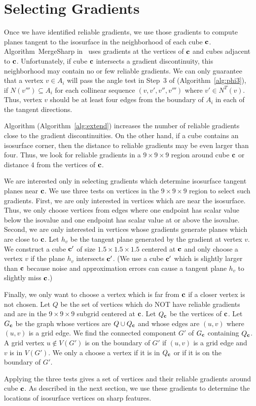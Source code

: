 
\section{Selecting Gradients}
\label{sec:grad_select}

Once we have identified reliable gradients,
we use those gradients to compute planes tangent to the isosurface
in the neighborhood of each cube $\mathbf{c}$.
Algorithm~MergeSharp in~\cite{bw-cisec-13}
uses gradients at the vertices of $\mathbf{c}$ and cubes adjacent to $\mathbf{c}$.
Unfortunately, if cube $\mathbf{c}$ intersects a gradient discontinuity,
this neighborhood may contain no or few reliable gradients.
We can only guarantee that a vertex $v \in A_i$ will pass the angle test
in Step~3 of \FindReliable (Algorithm~\ref{alg:phi3}),
if $N(v''') \subseteq A_i$ for each collinear sequence $(v,v',v'',v''')$
where $v' \in N^T(v)$.
Thus, vertex $v$ should be at least four edges from the boundary of $A_i$
in each of the tangent directions.

Algorithm \ExtendReliable (Algorithm~\ref{alg:extend}) increases
the number of reliable gradients close to the gradient discontinuities.
On the other hand, if a cube contains an isosurface corner,
then the distance to reliable gradients may be even larger than four.
Thus, we look for reliable gradients in a $9 \times 9 \times 9$ region
around cube $\mathbf{c}$ or distance 4 from the vertices of $\mathbf{c}$.

We are interested only in selecting gradients 
which determine isosurface tangent planes near $\mathbf{c}$.
We use three tests on vertices in the $9 \times 9 \times 9$ region
to select such gradients.
First, we are only interested in vertices which are near the isosurface.
Thus, we only choose vertices from edges
where one endpoint has scalar value below
the isovalue and one endpoint has scalar value at or above the isovalue.
Second, we are only interested in vertices whose gradients generate planes
which are close to $\mathbf{c}$.
Let $h_v$ be the tangent plane generated by the gradient at vertex $v$.
We construct a cube $\mathbf{c}'$ of size $1.5 \times 1.5 \times 1.5$ centered at $\mathbf{c}$
and only choose a vertex $v$ if the plane $h_v$ intersects $\mathbf{c}'$.
(We use a cube $\mathbf{c}'$ which is slightly larger than $\mathbf{c}$ 
because noise and approximation errors can cause a tangent plane $h_v$ 
to slightly miss $\mathbf{c}$.)

Finally, we only want to choose a vertex which is far from $\mathbf{c}$
if a closer vertex is not chosen.
Let $Q$ be the set of vertices which do NOT have reliable gradients
and are in the $9 \times 9 \times 9$ subgrid centered at $\mathbf{c}$.
Let $Q_{\mathbf{c}}$ be the vertices of $\mathbf{c}$.
Let $G_{\mathbf{c}}$ be the graph whose vertices are $Q \cup Q_{\mathbf{c}}$
and whose edges are $(u,v)$ where $(u,v)$ is a grid edge.
We find the connected component $G'$ of $G_{\mathbf{c}}$ containing $Q_{\mathbf{c}}$.
A grid vertex $u \not\in V(G')$ is on the boundary of $G'$
if $(u,v)$ is a grid edge and $v$ is in $V(G')$.
We only a choose a vertex if it is in $Q_{\mathbf{c}}$
or if it is on the boundary of $G'$.

Applying the three tests gives a set of vertices 
and their reliable gradients around cube $\mathbf{c}$.
As described in the next section,
we use these gradients to determine the locations 
of isosurface vertices on sharp features.

